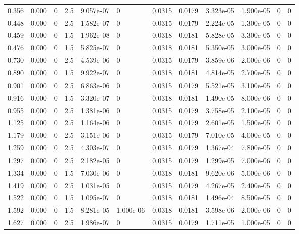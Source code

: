 \documentclass[preview]{standalone}
\begin{document}
{{\begin{tabular}{L{1.2cm}C{1.2cm} C{0.3cm}C{0.5cm} C{1.4cm}C{1.4cm} C{1.4cm}C{1.4cm} C{1.6cm}C{1.6cm} C{1.6cm}C{1.6cm}}
  0.356  &  0.000  & 0     & 2.5 &  9.057e-07  & 0  &  0.0315&   0.0179& 3.323e-05 & 1.900e-05   &  0 & 0  \\ 
  0.448  &  0.000  & 0     & 2.5 &  1.582e-07  & 0  &  0.0315&   0.0179& 2.224e-05 & 1.300e-05   &  0 & 0  \\ 
  0.459  &  0.000  & 0     & 1.5 &  1.962e-08  & 0  &  0.0318&   0.0181& 5.828e-05 & 3.300e-05   &  0 & 0  \\ 
  0.476  &  0.000  & 0     & 1.5 &  5.825e-07  & 0  &  0.0318&   0.0181& 5.350e-05 & 3.000e-05   &  0 & 0  \\ 
  0.730  &  0.000  & 0     & 2.5 &  4.539e-06  & 0  &  0.0315&   0.0179& 3.859e-06 & 2.000e-06   &  0 & 0  \\ 
  0.890  &  0.000  & 0     & 1.5 &  9.922e-07  & 0  &  0.0318&   0.0181& 4.814e-05 & 2.700e-05   &  0 & 0  \\ 
  0.901  &  0.000  & 0     & 2.5 &  6.863e-06  & 0  &  0.0315&   0.0179& 5.521e-05 & 3.100e-05   &  0 & 0  \\ 
  0.916  &  0.000  & 0     & 1.5 &  3.320e-07  & 0  &  0.0318&   0.0181& 1.490e-05 & 8.000e-06   &  0 & 0  \\ 
  0.955  &  0.000  & 0     & 2.5 &  1.381e-06  & 0  &  0.0315&   0.0179& 3.758e-05 & 2.100e-05   &  0 & 0  \\ 
  1.125  &  0.000  & 0     & 2.5 &  1.164e-06  & 0  &  0.0315&   0.0179& 2.601e-05 & 1.500e-05   &  0 & 0  \\ 
  1.179  &  0.000  & 0     & 2.5 &  3.151e-06  & 0  &  0.0315&   0.0179& 7.010e-05 & 4.000e-05   &  0 & 0  \\ 
  1.259  &  0.000  & 0     & 2.5 &  4.303e-07  & 0  &  0.0315&   0.0179& 1.367e-04 & 7.800e-05   &  0 & 0  \\ 
  1.297  &  0.000  & 0     & 2.5 &  2.182e-05  & 0  &  0.0315&   0.0179& 1.299e-05 & 7.000e-06   &  0 & 0  \\ 
  1.334  &  0.000  & 0     & 1.5 &  7.030e-06  & 0  &  0.0318&   0.0181& 9.620e-06 & 5.000e-06   &  0 & 0  \\ 
  1.419  &  0.000  & 0     & 2.5 &  1.031e-05  & 0  &  0.0315&   0.0179& 4.267e-05 & 2.400e-05   &  0 & 0  \\ 
  1.522  &  0.000  & 0     & 1.5 &  1.095e-07  & 0  &  0.0318&   0.0181& 1.496e-04 & 8.500e-05   &  0 & 0  \\ 
  1.592  &  0.000  & 0     & 1.5 &  8.281e-05  & 1.000e-06  &  0.0318&   0.0181& 3.598e-06 & 2.000e-06   &  0 & 0  \\ 
  1.627  &  0.000  & 0     & 2.5 &  1.986e-07  & 0  &  0.0315&   0.0179& 1.711e-05 & 1.000e-05   &  0 & 0  \\ 

\end{tabular}}}
\end{document}
